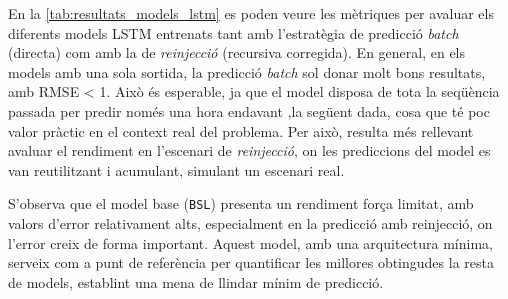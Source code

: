 \documentclass[../main.tex]{subfiles}
\begin{document}
En la \cref{tab:resultats_models_lstm}  es poden veure les mètriques per avaluar els diferents models LSTM entrenats tant amb l’estratègia de predicció \textit{batch} (directa) com amb la de \textit{reinjecció} (recursiva corregida). En general, en els models amb una sola sortida, la predicció \textit{batch} sol donar molt bons resultats, amb RMSE < 1. Això és esperable, ja que el model disposa de tota la seqüència passada per predir només una hora endavant ,la següent dada, cosa que té poc valor pràctic en el context real del problema. Per això, resulta més rellevant avaluar el rendiment en l’escenari de \textit{reinjecció}, on les prediccions del model es van reutilitzant i acumulant, simulant un escenari real.

S’observa que el model base (\texttt{BSL}) presenta un rendiment força limitat, amb valors d’error relativament alts, especialment en la predicció amb reinjecció, on l’error creix de forma important. Aquest model, amb una arquitectura mínima, serveix com a punt de referència per quantificar les millores obtingudes la resta de models, establint una mena de llindar mínim de predicció.
\end{document}
